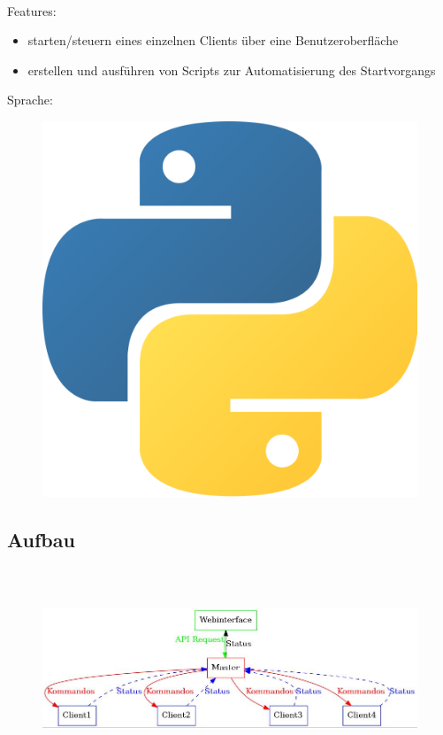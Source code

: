 \documentclass[accentcolor=tud1b,colorbacktitle,landscape,german,presentation]{tudbeamer}
\newcommand{\ftitle}{
	\frametitle{\insertsectionhead \\ {\small \insertsubsectionhead}}
}
\begin{document}
\subsection{}
\begin{frame}
	\ftitle
	Features:
	\begin{itemize}
		\item starten/steuern eines einzelnen Clients über eine Benutzeroberfläche
		\item erstellen und ausführen von Scripts zur Automatisierung des Startvorgangs
	\end{itemize}
	\vspace{0.5cm}
	Sprache:
	\begin{figure}
		\centering
		\includegraphics[scale=0.05]{python}
	\end{figure}
\end{frame}

\subsection{Aufbau}
\begin{frame}
	\ftitle
	\begin{figure}
		\includegraphics[scale=0.35]{master-client}
	\end{figure}
\end{frame}
\end{document}
